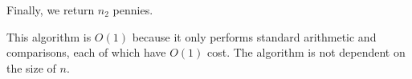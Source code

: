 \documentclass[12pt,letterpaper]{article}
\begin{document}
\begin{enumerate}
\begin{enumerate}
          Finally, we return $n_2$ pennies.

          This algorithm is $O(1)$ because it only performs standard arithmetic and comparisons, each of which have $O(1)$ cost.
          The algorithm is not dependent on the size of $n$.
      \end{enumerate}
  \end{enumerate}
\end{document}
